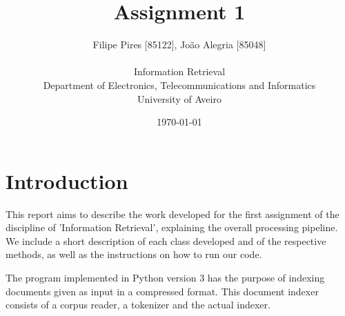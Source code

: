 \documentclass[12pt]{article}
\title{Assignment 1}
\author
{Filipe Pires [85122], João Alegria [85048]\\
\\
Information Retrieval\\
\normalsize{Department of Electronics, Telecommunications and Informatics}\\
\normalsize{University of Aveiro}\\
}
\date{\today{}}
\newenvironment{sciabstract}{%
\begin{quote} \bf}
{\end{quote}}
\begin{document}
 


\baselineskip18pt


\maketitle 


  


\section*{Introduction}

This report aims to describe the work developed for the first assignment
of the discipline of 'Information Retrieval', explaining the overall
processing pipeline.
We include a short description of each class developed and of the respective
methods, as well as the instructions on how to run our code.

The program implemented in Python version 3 has the purpose of indexing
documents given as input in a compressed format.
This document indexer consists of a corpus reader, a tokenizer and the 
actual indexer.
\end{document}
